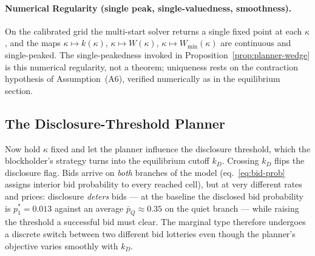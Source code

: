 \documentclass[11pt]{article}
\newcommand{\1}{\mathbf{1}}
\begin{document}
\paragraph{Numerical Regularity (single peak, single-valuedness, smoothness).}
On the calibrated grid the multi-start solver returns a single fixed point at each
$\kappa$, and the maps $\kappa\mapsto k(\kappa)$, $\kappa\mapsto W(\kappa)$,
$\kappa\mapsto W_{\min}(\kappa)$ are continuous and single-peaked. The
single-peakedness invoked in Proposition~\ref{prop:planner-wedge} is this
numerical regularity, not a theorem; uniqueness rests on the contraction
hypothesis of Assumption~\textup{(A6)}, verified numerically as in the
equilibrium section.

\subsection{The Disclosure-Threshold Planner}
\label{sec:welf-kD}

Now hold $\kappa$ fixed and let the planner influence the disclosure threshold,
which the blockholder's strategy turns into the equilibrium cutoff $k_D$. Crossing
$k_D$ flips the disclosure flag. Bids arrive on \emph{both} branches of the model
(eq.~\eqref{eq:bid-prob} assigns interior bid probability to every reached cell),
but at very different rates and prices: disclosure \emph{deters} bids --- at the
baseline the disclosed bid probability is $p_1^{\ast}=0.013$ against an average
$\bar p_Q\approx0.35$ on the quiet branch --- while raising the threshold a
successful bid must clear. The marginal type therefore undergoes a discrete
switch between two different bid lotteries even though the planner's objective
varies smoothly with $k_D$.
\end{document}
